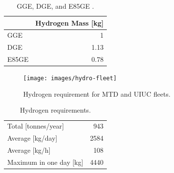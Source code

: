 \documentclass[11pt,letterpaper]{article}
\begin{document}
    \column[t]{5cm}
	\begin{table}[!htb]
		\centering
	    \caption{GGE, DGE, and E85GE \cite{doe_office_of_energy_efficiency_and_renewable_energy_hydrogen_2020} \cite{alternative_fuels_data_center_fuel_2014}.}
		\begin{tabular}{lr}
		\hline
		                 & Hydrogen Mass [kg] \\ \hline
		GGE              & 1                  \\
		DGE              & 1.13               \\
		E85GE            & 0.78               \\ \hline
        \end{tabular}
	\end{table}

	\begin{figure}[htbp!]
	    \centering
		\texttt{[image: images/hydro-fleet]}
		\hfill
		\caption{Hydrogen requirement for MTD and UIUC fleets.}
		\label{fig:hydro-fleet}
	\end{figure}

	\begin{table}[!htb]
		\centering
	    \caption{Hydrogen requirements.}
		\begin{tabular}{lr}
		\hline
		Total [tonnes/year]     & 943    \\
		Average [kg/day] 	    & 2584   \\
		Average [kg/h] 		    & 108    \\
		Maximum in one day [kg] & 4440   \\ \hline
        \end{tabular}
        \label{tab:hydro-fleet}
	\end{table}

	\column[t]{5cm}


\pagebreak


\end{document}
